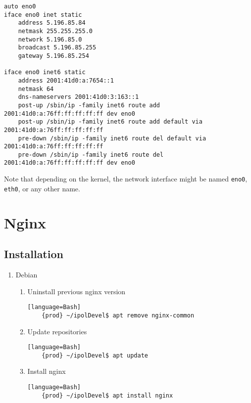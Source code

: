 \documentclass[a4paper,12pt]{article}
\begin{document}
\begin{verbatim}
auto eno0
iface eno0 inet static
    address 5.196.85.84
    netmask 255.255.255.0
    network 5.196.85.0
    broadcast 5.196.85.255
    gateway 5.196.85.254

iface eno0 inet6 static
    address 2001:41d0:a:7654::1
    netmask 64
    dns-nameservers 2001:41d0:3:163::1
    post-up /sbin/ip -family inet6 route add 2001:41d0:a:76ff:ff:ff:ff:ff dev eno0
    post-up /sbin/ip -family inet6 route add default via 2001:41d0:a:76ff:ff:ff:ff:ff
    pre-down /sbin/ip -family inet6 route del default via 2001:41d0:a:76ff:ff:ff:ff:ff
    pre-down /sbin/ip -family inet6 route del 2001:41d0:a:76ff:ff:ff:ff:ff dev eno0
\end{verbatim}

Note that depending on the kernel, the network interface might be named {\tt eno0}, {\tt eth0}, or any other name.


\begin{comment}
\subsection{Manual configurations}
Some of the installed packages need manual changes in their configuration.

- Octave: edit the file {\tt /usr/share/octave/site/m/startup/octaverc} and {\tt add pkg load image}.
\end{comment}


\section{Nginx}

\subsection{Installation}

\begin{enumerate}
\item Debian

\begin{enumerate}
    \item Uninstall previous nginx version
    \begin{verbatim}[language=Bash]
	{prod} ~/ipolDevel$ apt remove nginx-common
    \end{verbatim}

    \item Update repositories
    \begin{verbatim}[language=Bash]
    {prod} ~/ipolDevel$ apt update
    \end{verbatim}

    \item Install nginx
    \begin{verbatim}[language=Bash]
    {prod} ~/ipolDevel$ apt install nginx
    \end{verbatim}
    \end{enumerate}    
\end{enumerate}
\end{document}
